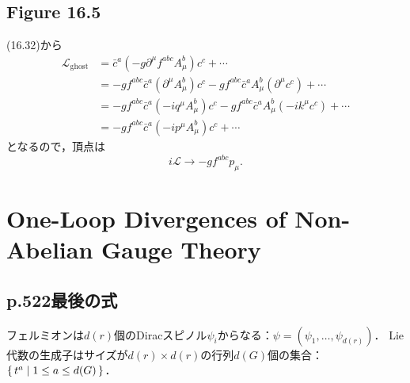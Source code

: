 \subsection{Figure 16.5}
\begin{center}
\end{center}

(16.32)から
\begin{align*}
  \mathcal{L}_\text{ghost} &= \bar{c}^a \left( -g\partial^\mu f^{abc} A^b_\mu \right) c^c + \cdots \\
  &= -gf^{abc} \bar{c}^a (\partial^\mu A^b_\mu) c^c - gf^{abc} \bar{c}^a A^b_\mu (\partial^\mu c^c) + \cdots \\
  &= -gf^{abc} \bar{c}^a (-iq^\mu A^b_\mu) c^c - gf^{abc} \bar{c}^a A^b_\mu (-ik^\mu c^c) + \cdots \\
  &= -gf^{abc} \bar{c}^a (-ip^\mu A^b_\mu) c^c + \cdots
\end{align*}
となるので，頂点は
\[ i\mathcal{L} \to -gf^{abc}p_\mu . \]

\setcounter{section}{4}
\section{One-Loop Divergences of Non-Abelian Gauge Theory}
\subsection{p.522最後の式}
フェルミオンは$d(r)$個のDiracスピノル$\psi_i$からなる：$\psi = (\psi_1 , \ldots, \psi_{d(r)})$．
Lie代数の生成子はサイズが$d(r) \times d(r)$の行列$d(G)$個の集合：$\set{t^a | 1 \leq a \leq d(G)}$．

